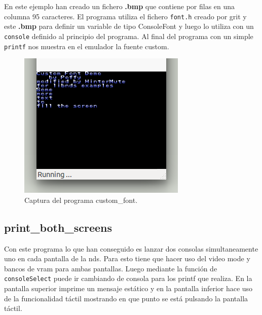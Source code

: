 \documentclass[12pt,english]{article}
\begin{document}
    En este ejemplo han creado un fichero \textbf{.bmp} que contiene por filas en una columna 95 caracteres. El programa utiliza el fichero \texttt{font.h} creado por grit y este \textbf{.bmp} para definir un variable de tipo ConsoleFont y luego lo utiliza con un \texttt{console} definido al principio del programa. Al final del programa con un simple \texttt{printf} nos muestra en el emulador la fuente custom.

    \begin{figure}[H] 
    \centering
    \includegraphics[scale=0.5]{images/custom_font}
    \caption{Captura del programa custom\_font.}
    \end{figure}

    \newpage

    \subsection{print\_both\_screens}

    Con este programa lo que han conseguido es lanzar dos consolas simultaneamente uno en cada pantalla de la nds. Para esto tiene que hacer uso del video mode y bancos de vram para ambas pantallas. Luego mediante la función de \texttt{consoleSelect} puede ir cambiando de consola para los printf que realiza. En la pantalla superior imprime un mensaje estático y en la pantalla inferior hace uso de la funcionalidad táctil mostrando en que punto se está pulsando la pantalla táctil.
\end{document}
